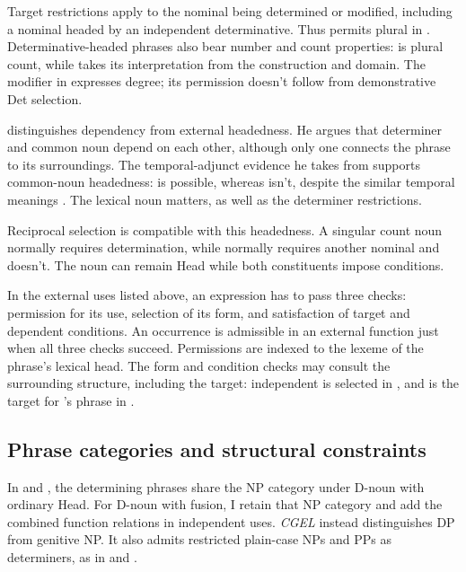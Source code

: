 \documentclass[12pt]{article}
\begin{document}
Target restrictions apply to the nominal being determined or modified, including a nominal headed by an independent determinative. Thus  permits plural  in . Determinative-headed phrases also bear number and count properties:  is plural count, while  takes its interpretation from the construction and domain. The modifier  in  expresses degree; its permission doesn't follow from demonstrative Det selection.

\textcite[7--8]{hudson2004determiners} distinguishes dependency from external headedness. He argues that determiner and common noun depend on each other, although only one connects the phrase to its surroundings. The temporal-adjunct evidence he takes from \textcite{vanlangendonck1994} supports common-noun headedness:  is possible, whereas  isn't, despite the similar temporal meanings \citep[10--12]{hudson2004determiners}. The lexical noun matters, as well as the determiner restrictions.

Reciprocal selection is compatible with this headedness. A singular count noun normally requires determination, while  normally requires another nominal and  doesn't. The noun can remain Head while both constituents impose conditions.

In the external uses listed above, an expression has to pass three checks: permission for its use, selection of its form, and satisfaction of target and dependent conditions. An occurrence is admissible in an external function just when all three checks succeed. Permissions are indexed to the lexeme of the phrase's lexical head. The form and condition checks may consult the surrounding structure, including the target: independent  is selected in , and  is the target for 's phrase in .

\subsection{Phrase categories and structural constraints}\label{sec:det-uniform}

In  and , the determining phrases share the NP category under D-noun with ordinary Head. For D-noun with fusion, I retain that NP category and add the combined function relations in independent uses. \textit{CGEL} instead distinguishes DP from genitive NP. It also admits restricted plain-case NPs and PPs as determiners, as in  and  \citep[Ch.~5, §4]{huddleston2002}.
\end{document}
